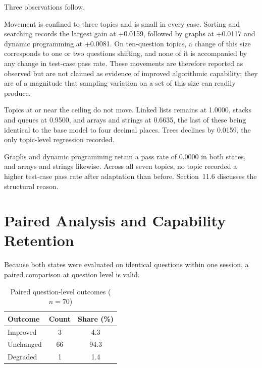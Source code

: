 \documentclass[12pt,a4paper]{report}
\begin{document}
Three observations follow.

Movement is confined to three topics and is small in every case. Sorting and searching records the largest gain at +0.0159, followed by graphs at +0.0117 and dynamic programming at +0.0081. On ten-question topics, a change of this size corresponds to one or two questions shifting, and none of it is accompanied by any change in test-case pass rate. These movements are therefore reported as observed but are not claimed as evidence of improved algorithmic capability; they are of a magnitude that sampling variation on a set of this size can readily produce.

Topics at or near the ceiling do not move. Linked lists remains at 1.0000, stacks and queues at 0.9500, and arrays and strings at 0.6635, the last of these being identical to the base model to four decimal places. Trees declines by 0.0159, the only topic-level regression recorded.

Graphs and dynamic programming retain a pass rate of 0.0000 in both states, and arrays and strings likewise. Across all seven topics, no topic recorded a higher test-case pass rate after adaptation than before. Section~11.6 discusses the structural reason.

\section{Paired Analysis and Capability Retention}

Because both states were evaluated on identical questions within one session, a paired comparison at question level is valid.

\begin{table}[htbp]
\centering
\caption{Paired question-level outcomes ($n = 70$)}
\begin{tabular}{>{\raggedright\arraybackslash}p{3cm} c c}
\toprule
\textbf{Outcome} & \textbf{Count} & \textbf{Share (\%)} \\
\midrule
Improved & 3 & 4.3 \\
Unchanged & 66 & 94.3 \\
Degraded & 1 & 1.4 \\
\bottomrule
\end{tabular}
\end{table}
\end{document}
